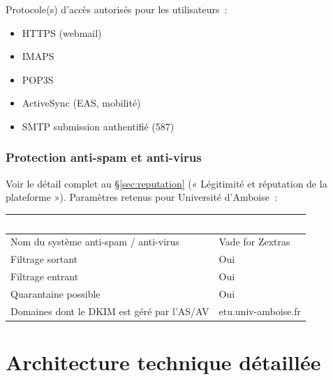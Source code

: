 \documentclass[11pt,a4paper]{report}
\newcommand{\tblhead}[1]{\textcolor{white}{\textbf{#1}}}
\begin{document}
Protocole(s) d'accès autorisés pour les utilisateurs~:
\begin{itemize}[nosep]
  \item HTTPS (webmail)
  \item IMAPS
  \item POP3S
  \item ActiveSync (EAS, mobilité)
  \item SMTP submission authentifié (587)
\end{itemize}

\subsection{Protection anti-spam et anti-virus}
Voir le détail complet au \S\ref{sec:reputation} (« Légitimité et réputation de la plateforme »). Paramètres retenus pour Université d'Amboise~:

\begin{longtable}{|p{7cm}|p{6cm}|}
\hline
\rowcolor{primary}\tblhead{Paramètre} & \tblhead{Valeur} \\
\hline
\endhead
Nom du système anti-spam / anti-virus & Vade for Zextras \\
\hline
Filtrage sortant & Oui \\
\hline
Filtrage entrant & Oui \\
\hline
Quarantaine possible & Oui \\
\hline
Domaines dont le DKIM est géré par l'AS/AV & etu.\allowbreak{}univ-\allowbreak{}amboise.\allowbreak{}fr \\
\hline
\end{longtable}

\chapter{Architecture technique détaillée}
\label{sec:archi-detaillee}
\end{document}
